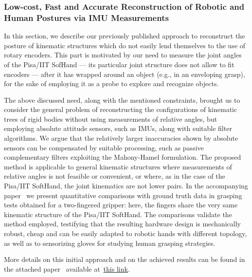 
\subsubsection{Low-cost, Fast and Accurate Reconstruction of Robotic and Human Postures via IMU Measurements}
\label{sec:IMUGlove}

In this section, we describe our previously published approach to reconstruct the posture of kinematic structures which do not easily lend themselves to the use of rotary encoders. This part is motivated by our need to measure the joint angles of the Pisa/IIT SofHand --- its particular joint structure does not allow to fit encoders ---  after it has wrapped around an object (e.g., in an enveloping grasp), for the sake of employing it as a probe to explore and recognize objects.

The above discussed need, along with the mentioned constraints, brought us to consider the general problem of reconstructing the configurations of kinematic trees of rigid bodies without using measurements of relative angles, but employing absolute attitude sensors, such as IMUs, along with suitable filter algorithms. We argue that the relatively larger inaccuracies shown by absolute sensors can be compensated by suitable processing, such as passive complementary filters exploiting the Mahony-Hamel formulation. The proposed method is applicable to general kinematic structures where measurements of relative angles is not feasible or convenient, or where, as in the case of the Pisa/IIT SoftHand, the joint kinematics are not lower pairs. In the accompanying paper~\cite{Santaera:ICRA:2015} we present quantitative comparisons with ground truth data in grasping tests obtained for a two-fingered gripper: here, the fingers share the very same kinematic structure of the Pisa/IIT SoftHand. The comparisons validate the method employed, testifying that the resulting hardware design is mechanically robust, cheap and can be easily adapted to robotic hands with different topology, as well as to sensorizing gloves for studying human grasping strategies.

More details on this initial approach and on the achieved results can be found in the attached paper~\cite{Santaera:ICRA:2015} available at~\href{./attachedPapers/ReconstructionPosturesImuMeasurements.pdf}{this link}.  
